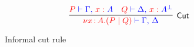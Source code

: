 \begin{figure}
\[\colored
\inference{
  \tm{P} \tpvdash \tp{\Gamma \comma \tmof{x}A}
  &
  \tm{Q} \tpvdash \tp{\Delta \comma \tmof{x}\dualbt{A}}
}{Cut}{
  \tm{\nu x \of{A}.(P \mid Q)} \tpvdash \tp{\Gamma \comma \Delta}
}
\]
\caption{Informal cut rule}
\label{fig:papercut}
\end{figure}

